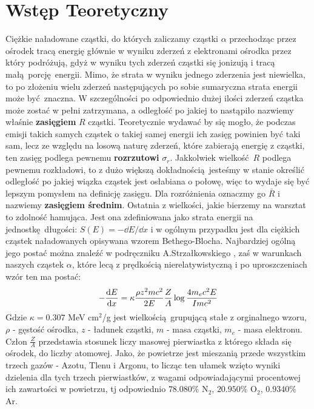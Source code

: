 \documentclass[12pt,a4paper]{article}
\renewcommand{\emph}{\textbf}
\begin{document}
\section{Wstęp Teoretyczny}

Ciężkie naładowane cząstki, do których zaliczamy cząstki $\alpha$ przechodząc przez ośrodek tracą energię głównie w wyniku zderzeń z elektronami ośrodka przez który podróżują, gdyż w wyniku tych zderzeń cząstki się jonizują i tracą małą porcję energii. Mimo, że strata w wyniku jednego zderzenia jest niewielka, to po złożeniu wielu zderzeń następujących po sobie sumaryczna strata energii może być znaczna. W szczególności po odpowiednio dużej ilości zderzeń cząstka może zostać w pełni zatrzymana, a odległość po jakiej to nastąpiło nazwiemy właśnie \emph{zasięgiem} $R$ cząstki.
Teoretycznie wydawać by się mogło, że podczas emisji takich samych cząstek o takiej samej energii ich zasięg powinien być taki sam, lecz ze względu na losową naturę zderzeń, które zabierają energię z cząstki, ten zasięg podlega pewnemu \emph{rozrzutowi} $\sigma_r$.
Jakkolwiek wielkość $R$ podlega pewnemu rozkładowi, to z dużo większą dokładnością jesteśmy w stanie określić odległość po jakiej wiązka cząstek jest osłabiana o połowę, więc to wydaje się być lepszym pomysłem na definicję zasięgu. Dla rozróżnienia oznaczmy go $\bar{R} $ i nazwiemy \emph{zasięgiem średnim}.
Ostatnia z wielkości, jakie bierzemy na warsztat to zdolność hamująca. Jest ona zdefiniowana jako strata energii na jednostkę długości: $S(E) = - \dd{E}/\dd{x}$ i w ogólnym przypadku jest dla ciężkich cząstek naładowanych opisywana wzorem Bethego-Blocha. Najbardziej ogólną jego postać można znaleźć w podręczniku A.Strzałkowskiego \cite{strzalkowski}, zaś w warunkach naszych cząstek $\alpha$, które lecą z prędkością nierelatywistyczną i po uproszczeniach wzór ten ma postać:
\begin{equation}\label{eq:bethe_bloch}
    -\dv{E}{x} = \kappa \frac{\rho z^2 m c^2}{2E} \frac{Z}{A} \log\frac{4 m_e c^2 E}{Imc^2}
\end{equation}
Gdzie $\kappa = 0.307$ MeV cm$^2$/g jest wielkością grupującą stałe z orginalnego wzoru, $\rho$ - gęstość ośrodka, $z$ - ładunek cząstki, $m$ - masa cząstki, $m_e$ - masa elektronu. Człon $\frac{Z}{A}$ przedstawia stosunek liczy masowej pierwiastka z którego składa się ośrodek, do liczby atomowej. Jako, że powietrze jest mieszanią przede wszystkim trzech gazów - Azotu, Tlenu i Argonu, to licząc ten ułamek wzięto wyniki dzielenia dla tych trzech pierwiastków, z wagami odpowiadającymi procentowej ich zawartości w powietrzu, tj odpowiednio $78.080\%$ N$_2$, $20.950\%$ O$_2$, $0.9340\%$ Ar.
\end{document}
